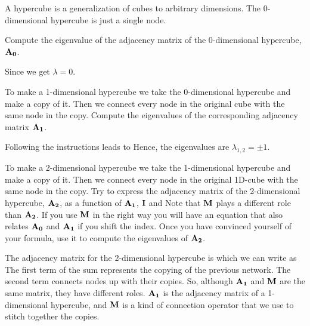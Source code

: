 A hypercube is a generalization of cubes to arbitrary dimensions. The 0-dimensional hypercube is just a single node. 

\subquestion
Compute the eigenvalue of the adjacency matrix of the 0-dimensional hypercube, ${\bf A_0}$.

\solution
Since 
we get $\lambda=0$.

\subquestion
To make a 1-dimensional hypercube we take the 0-dimensional hypercube and make a copy of it. Then we connect every node in the original cube with the same node in the copy. Compute the eigenvalues of the corresponding adjacency matrix ${\bf A_1}$. 

\solution
Following the instructions leads to 
Hence, the eigenvalues are $\lambda_{1,2}=\pm 1$.

\subquestion
To make a 2-dimensional hypercube we take the 1-dimensional hypercube and make a copy of it. Then we connect every node in the original 1D-cube with the same node in the copy. Try to express the adjacency matrix of the 2-dimensional hypercube, $\bf A_2$, as a function of $\bf A_1$, $\bf I$ and 
Note that $\bf M$ plays a different role than $\bf A_2$. If you use $\bf M$ in the right way you will have an equation that also relates $\bf A_0$ and $\bf A_1$ if you shift the index. Once you have convinced yourself of your formula, use it to compute the eigenvalues of $\bf A_2$.

\solution
The adjacency matrix for the 2-dimensional hypercube is 
which we can write as 
The first term of the sum represents the copying of the previous network. The second term connects nodes up with their copies. So, although $\bf A_1$ and $\bf M$ are the same matrix, they have different roles. $\bf A_1$ is the adjacency matrix of a 1-dimensional hypercube, and $\bf M$ is a kind of connection operator that we use to stitch together the copies.  

